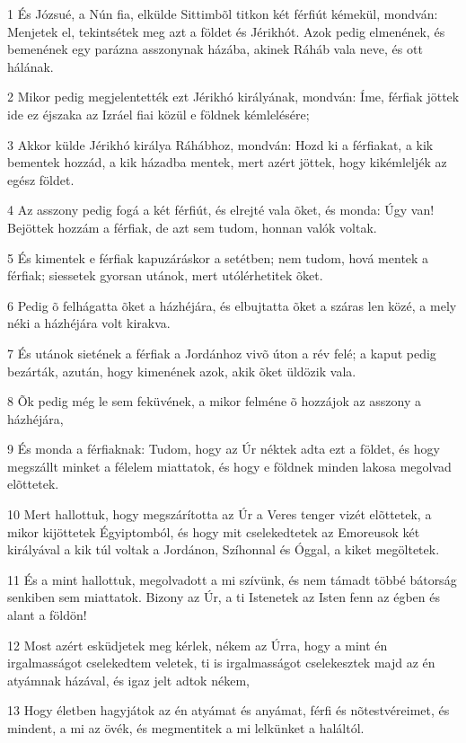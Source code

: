 \par 1 És Józsué, a Nún fia, elkülde Sittimbõl titkon két férfiút kémekül, mondván: Menjetek el, tekintsétek meg azt a földet és Jérikhót. Azok pedig elmenének, és bemenének egy parázna asszonynak házába, akinek Ráháb vala neve, és ott hálának.
\par 2 Mikor pedig megjelentették ezt Jérikhó királyának, mondván: Íme, férfiak jöttek ide ez éjszaka az Izráel fiai közül e földnek kémlelésére;
\par 3 Akkor külde Jérikhó királya Ráhábhoz, mondván: Hozd ki a férfiakat, a kik bementek hozzád, a kik házadba mentek, mert azért jöttek, hogy kikémleljék az egész földet.
\par 4 Az asszony pedig fogá a két férfiút, és elrejté vala õket, és monda: Úgy van! Bejöttek hozzám a férfiak, de azt sem tudom, honnan valók voltak.
\par 5 És kimentek e férfiak kapuzáráskor a setétben; nem tudom, hová mentek a férfiak; siessetek gyorsan utánok, mert utólérhetitek õket.
\par 6 Pedig õ felhágatta õket a házhéjára, és elbujtatta õket a száras len közé, a mely néki a házhéjára volt kirakva.
\par 7 És utánok sietének a férfiak a Jordánhoz vivõ úton a rév felé; a kaput pedig bezárták, azután, hogy kimenének azok, akik õket üldözik vala.
\par 8 Õk pedig még le sem feküvének, a mikor felméne õ hozzájok az asszony a házhéjára,
\par 9 És monda a férfiaknak: Tudom, hogy az Úr néktek adta ezt a földet, és hogy megszállt minket a félelem miattatok, és hogy e földnek minden lakosa megolvad elõttetek.
\par 10 Mert hallottuk, hogy megszárította az Úr a Veres tenger vizét elõttetek, a mikor kijöttetek Égyiptomból, és hogy mit cselekedtetek az Emoreusok két királyával  a kik túl voltak a Jordánon, Szíhonnal és Óggal, a kiket megöltetek.
\par 11 És a mint hallottuk, megolvadott a mi szívünk, és nem támadt többé bátorság senkiben sem miattatok. Bizony az Úr, a ti Istenetek  az Isten fenn az égben és alant a földön!
\par 12 Most azért esküdjetek meg kérlek, nékem az Úrra, hogy a mint én irgalmasságot cselekedtem veletek, ti is irgalmasságot cselekesztek majd az én atyámnak házával, és igaz jelt adtok nékem,
\par 13 Hogy életben hagyjátok az én atyámat és anyámat, férfi és nõtestvéreimet, és mindent, a mi az övék, és megmentitek a mi lelkünket a haláltól.

